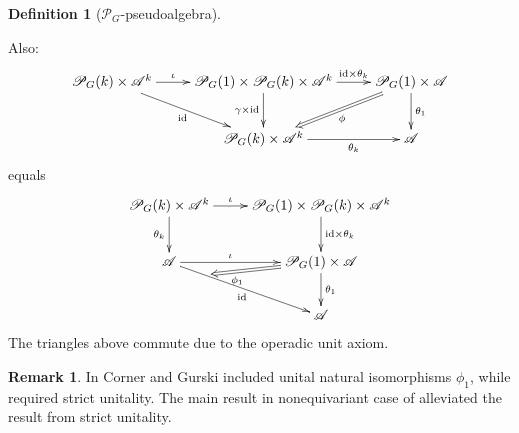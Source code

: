 \documentclass[openany, amssymb, psamsfonts]{amsart}
\theoremstyle{definition}
\newtheorem{defn}{Definition}[section]
\newtheorem{rem}{Remark}[section]
\numberwithin{equation}{section}
\newcommand{\cP}{\mathscr{P}} %
\newcommand{\A}{\mathscr{A}}
\newcommand{\id}{\mathrm{id}} %
\begin{document}
\begin{defn}[$\cP_G$-pseudoalgebra]
\begin{itemize}
        Also:
        \begin{align*}
            \xymatrix{
                \cP_G(k)\times\A^k\ar[r]^-{\iota} \ar[dr]_-{\id} & \cP_G(1)\times\cP_G(k)\times \A^k \ar[r]^-{\id\times\theta_k} \ar[d]_-{\gamma\times\id} & \cP_G(1)\times\A \ar[d]^-{\theta_1} \ar@{=>}[dl]^-{\phi}\\
                &\cP_G(k)\times\A^k \ar[r]_-{\theta_k} & \A
            }
        \end{align*}
        equals
        \begin{align*}
            \xymatrix{
                \cP_G(k)\times \A^k \ar[r]^-{\iota} \ar[d]_-{\theta_k} & \cP_G(1)\times\cP_G(k)\times \A^k \ar[d]^-{\id\times\theta_k}\\
                \A \ar[r]^-{\iota} \ar[dr]_-{\id} & \cP_G(1)\times\A \ar[d]^-{\theta_1} \ar@{=>}[dl]+<30pt>^>>>>>>>{\phi_1}\\
                & \A
            }
        \end{align*}
        The triangles above commute due to the operadic unit axiom.
    \end{itemize}
\end{defn}

\begin{rem}
    In \cite{CG14} Corner and Gurski included unital natural isomorphisms $\phi_1$, while \cite{GMMO20} required strict unitality. The main result in nonequivariant case of \cite{LMRZ26} alleviated the result from strict unitality.
\end{rem}
\end{document}
